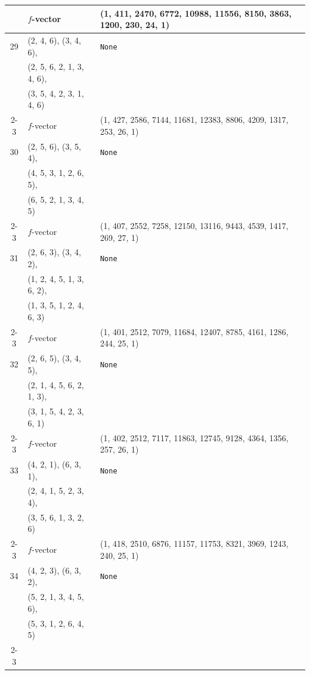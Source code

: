 \documentclass[10pt]{amsart}
\numberwithin{equation}{section}
\theoremstyle{plain}
\theoremstyle{definition}
\theoremstyle{remark}
\begin{document}
{\begin{longtable}{c|l|l}
		& $f$-vector & {(1, 411, 2470, 6772, 10988, 11556, 8150, 3863, 1200, 230, 24, 1)} \\
		\midrule
		
		29 & (2, 4, 6), (3, 4, 6), & \texttt{None} \\
		& (2, 5, 6, 2, 1, 3, 4, 6), &  \\
		& (3, 5, 4, 2, 3, 1, 4, 6) &  \\ \cline{2-3}
		
		& $f$-vector & {(1, 427, 2586, 7144, 11681, 12383, 8806, 4209, 1317, 253, 26, 1)} \\
		\midrule
		
		30 & (2, 5, 6), (3, 5, 4), & \texttt{None} \\
		& (4, 5, 3, 1, 2, 6, 5), &  \\
		& (6, 5, 2, 1, 3, 4, 5) &  \\ \cline{2-3}
		
		& $f$-vector & {(1, 407, 2552, 7258, 12150, 13116, 9443, 4539, 1417, 269, 27, 1)} \\
		\midrule
		
		31 & (2, 6, 3), (3, 4, 2), & \texttt{None} \\
		& (1, 2, 4, 5, 1, 3, 6, 2), &  \\
		& (1, 3, 5, 1, 2, 4, 6, 3) &  \\ \cline{2-3}
		
		& $f$-vector & {(1, 401, 2512, 7079, 11684, 12407, 8785, 4161, 1286, 244, 25, 1)} \\
		\midrule
		
		32 & (2, 6, 5), (3, 4, 5), & \texttt{None} \\
		& (2, 1, 4, 5, 6, 2, 1, 3), &  \\
		& (3, 1, 5, 4, 2, 3, 6, 1) &  \\ \cline{2-3}
		
		& $f$-vector & {(1, 402, 2512, 7117, 11863, 12745, 9128, 4364, 1356, 257, 26, 1)} \\
		\midrule
		
		33 & (4, 2, 1), (6, 3, 1), & \texttt{None} \\
		& (2, 4, 1, 5, 2, 3, 4), &  \\
		& (3, 5, 6, 1, 3, 2, 6) &  \\ \cline{2-3}
		
		& $f$-vector & {(1, 418, 2510, 6876, 11157, 11753, 8321, 3969, 1243, 240, 25, 1)} \\
		\midrule
		
		34 & (4, 2, 3), (6, 3, 2), & \texttt{None} \\
		& (5, 2, 1, 3, 4, 5, 6), &  \\
		& (5, 3, 1, 2, 6, 4, 5) &  \\ \cline{2-3}
		

\end{longtable}}
\end{document}
